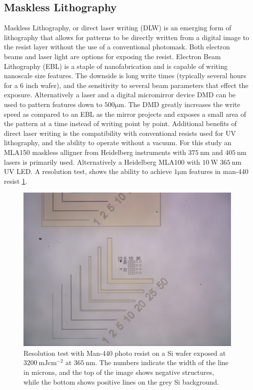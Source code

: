 \subsection{Maskless Lithography}
Maskless Lithography, or direct laser writing (DLW) is an emerging form of lithography that allows for patterns to be directly written from a digital image to the resist layer without the use of a conventional photomask. Both electron beams and laser light are options for exposing the resist. Electron Beam Lithography (EBL) is a staple of nanofabrication and is capable of writing nanoscale size features. The downside is long write times (typically several hours for a $6$ inch wafer), and the sensitivity to several beam parameters that effect the exposure. Alternatively a laser and a digital micromirror device DMD can be used to pattern features down to $500 \si{\micro\meter}$. The DMD greatly increases the write speed as compared to an EBL as the mirror projects and exposes a small area of the pattern at a time instead of writing point by point. Additional benefits of direct laser writing is the compatibility with conventional resists used for UV lithography, and the ability to operate without a vacuum. For this study an MLA150 maskless alligner from Heidelberg instruments with $\SI{375}{\nm}$ and $\SI{405}{\nm}$lasers is primarily used. Alternatively a Heidelberg MLA100 with $\SI{10}{\watt}$ $\SI{365}{\nm}$ UV LED. A resolution test, shows the ability to achieve $ 1 \si{\micro \meter}$ features in man-440 resist \ref{fig:resolution_test}. 

\begin{figure}[!htb]
    \centering
    \includegraphics[width=\textwidth]{fig/Results/resolution_test.jpg}
    \caption{Resolution test with Man-440 photo resist on a Si wafer exposed at  $\SI{3200}{\milli \joule \cm^{-2}}$ at $\SI{365}{\nm}$. The numbers indicate the width of the line in microns, and the top of the image shows negative structures, while the bottom shows positive lines on the grey Si background.}
    \label{fig:resolution_test}
\end{figure}

